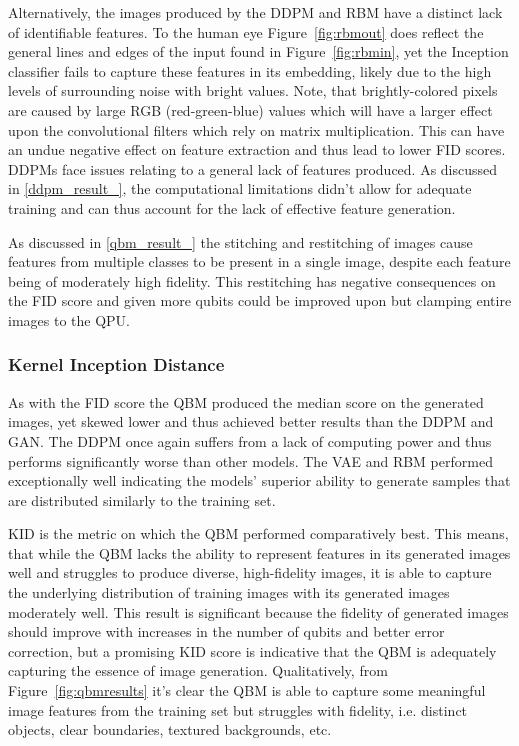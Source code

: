 \documentclass[%
 reprint,
 amsmath,amssymb,
 aps,
]{revtex4-2}
\begin{document}
Alternatively, the images produced by the DDPM and RBM have a distinct lack of identifiable features. To the human eye Figure~\ref{fig:rbmout} does reflect the general lines and edges of the input found in Figure~\ref{fig:rbmin}, yet the Inception classifier fails to capture these features in its embedding, likely due to the high levels of surrounding noise with bright values. Note, that brightly-colored pixels are caused by large RGB (red-green-blue) values which will have a larger effect upon the convolutional filters which rely on matrix multiplication. This can have an undue negative effect on feature extraction and thus lead to lower FID scores. DDPMs face issues relating to a general lack of features produced. As discussed in \ref{ddpm_result_}, the computational limitations didn't allow for adequate training and can thus account for the lack of effective feature generation.


As discussed in \ref{qbm_result_} the stitching and restitching of images cause features from multiple classes to be present in a single image, despite each feature being of moderately high fidelity.  This restitching has negative consequences on the FID score and given more qubits could be improved upon but clamping entire images to the QPU.


\subsubsection{Kernel Inception Distance}
As with the FID score the QBM produced the median score on the generated images, yet skewed lower and thus achieved better results than the DDPM and GAN. The DDPM once again suffers from a lack of computing power and thus performs significantly worse than other models. The VAE and RBM performed exceptionally well indicating the models' superior ability to generate samples that are distributed similarly to the training set.


KID is the metric on which the QBM performed comparatively best. This means, that while the QBM lacks the ability to represent features in its generated images well and struggles to produce diverse, high-fidelity images, it is able to capture the underlying distribution of training images with its generated images moderately well. This result is significant because the fidelity of generated images should improve with increases in the number of qubits and better error correction, but a promising KID score is indicative that the QBM is adequately capturing the essence of image generation. Qualitatively, from Figure~\ref{fig:qbmresults} it's clear the QBM is able to capture some meaningful image features from the training set but struggles with fidelity, i.e. distinct objects, clear boundaries, textured backgrounds, etc.
\end{document}
